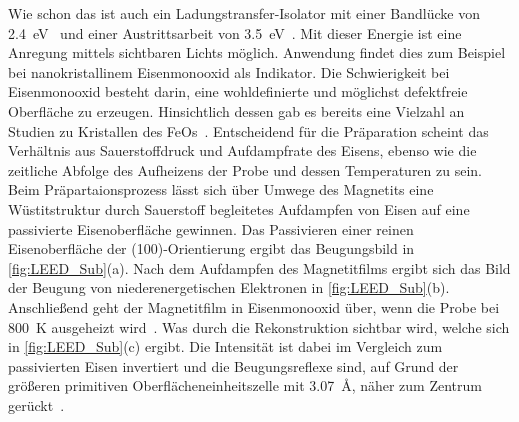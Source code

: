             Wie schon das  ist auch  ein Ladungstransfer-Isolator mit einer Bandlücke von \SI{2.4}{\electronvolt}~\cite{FeO_21} und einer Austrittsarbeit von \SI{3.5}{\electronvolt}~\cite{FeO_28}.
            Mit dieser Energie ist eine Anregung mittels sichtbaren Lichts möglich.
            Anwendung findet dies zum Beispiel bei nanokristallinem Eisenmonooxid als Indikator.
            Die Schwierigkeit bei Eisenmonooxid besteht darin, eine wohldefinierte und möglichst defektfreie Oberfläche zu erzeugen.
            Hinsichtlich dessen gab es bereits eine Vielzahl an Studien zu Kristallen des FeOs~\cite{FeO_7, FeO_19, FeO_26, FeO_23, FeO_27}.
            Entscheidend für die Präparation scheint das Verhältnis aus Sauerstoffdruck und Aufdampfrate des Eisens, ebenso wie die zeitliche Abfolge des Aufheizens der Probe und dessen Temperaturen zu sein.
            Beim Präpartaionsprozess lässt sich über Umwege des Magnetits eine Wüstitstruktur durch Sauerstoff begleitetes Aufdampfen von Eisen auf eine passivierte Eisenoberfläche gewinnen.
            Das Passivieren einer reinen Eisenoberfläche der (100)-Orientierung ergibt das Beugungsbild in \autoref{fig:LEED_Sub}(a).
            Nach dem Aufdampfen des Magnetitfilms ergibt sich das Bild der Beugung von niederenergetischen Elektronen in \autoref{fig:LEED_Sub}(b).
            Anschließend geht der Magnetitfilm in Eisenmonooxid über, wenn die Probe bei \SI{800}{\kelvin} ausgeheizt wird~\cite{FeO_1}.
            Was durch die Rekonstruktion sichtbar wird, welche sich in \autoref{fig:LEED_Sub}(c) ergibt.
            Die Intensität ist dabei im Vergleich zum passivierten Eisen invertiert und die Beugungsreflexe sind, auf Grund der größeren primitiven Oberflächeneinheitszelle mit \SI{3.07}{\angstrom}, näher zum Zentrum gerückt~\cite{FeO_1}.

